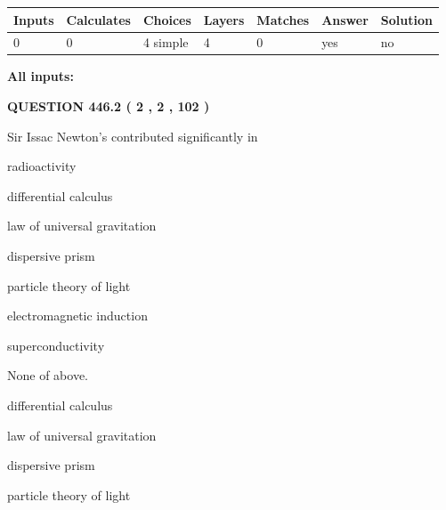 \documentclass[12pt]{article}
\begin{document}
 
   
   
   
   
\noindent\begin{tabular}{|l|l|l|l|l|l|l|}
 \hline
Inputs & Calculates & Choices & Layers & Matches & Answer & Solution \\ \hline
 0  & 
 0  & 
 4
  simple  
  & 
 4  & 
 0  & 
  yes & 
  no 
  \\ \hline
 \end{tabular}
   
   
   
   
\noindent{}
   
   
   
   
\noindent\vspace{0.1in}\hspace{-0.08in} {\textbf{\Large{All inputs: }}}
   
   
  
\vspace{0.2in}
  
{\textbf{\Large{QUESTION
446.2 
 ( 2 , 2 , 102 )
}}}
  
  
Sir Issac Newton's contributed significantly in
 
 
radioactivity
 
 
differential calculus
 
 
law of universal gravitation
 
 
dispersive prism
 
 
particle theory of light
 
 
electromagnetic induction
 
 
superconductivity
 
 
 None of above.
 
 
\noindent{}
 
 
differential calculus
 
 
law of universal gravitation
 
 
dispersive prism
 
 
particle theory of light
 
\end{document}
